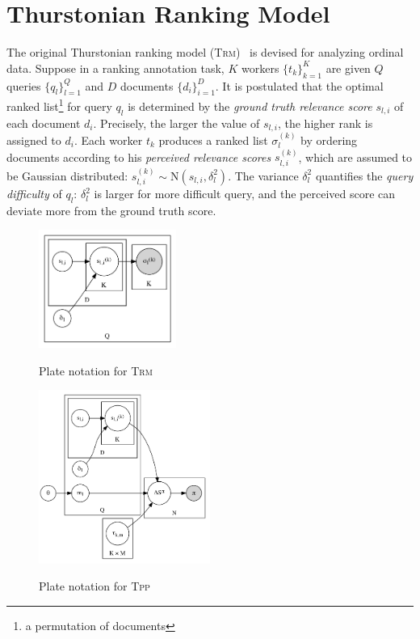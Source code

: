 \section{Thurstonian Ranking Model} \label{sec::tpp_trm}

The original Thurstonian ranking model (\textsc{Trm})~\cite{thurstone1927law} is
devised for analyzing ordinal data.  Suppose in a ranking annotation task, $K$
workers $\{t_k\}_{k=1}^{K}$ are given $Q$ queries $\{q_l\}_{l=1}^Q$ and $D$
documents $\{d_i\}_{i=1}^D$.  It is postulated that the optimal ranked
list\footnote{a permutation of documents} for query $q_l$ is determined by the
\emph{ground truth relevance score} $s_{l,i}$ of each document $d_i$.
Precisely, the larger the value of $s_{l,i}$, the higher rank is assigned to
$d_i$.  Each worker $t_k$ produces a ranked list $\sigma_l^{(k)}$ by ordering
documents according to his \emph{perceived relevance scores} $s_{l,i}^{(k)}$,
which are assumed to be Gaussian distributed: $s_{l,i}^{(k)} \sim
\mathrm{N}(s_{l,i}, \delta_l^2)$.  The variance $\delta_l^2$ quantifies the
\emph{query difficulty} of $q_l$: $\delta_l^2$ is larger for more difficult
query, and the perceived score can deviate more from the ground truth score.

\begin{figure}[h!]
	\begin{center}
		\includegraphics[width=0.4\textwidth]{crowd-thurstonian/figure/thurstonian.png}
		\caption{Plate notation for \textsc{Trm}} \label{fig::thurstonian}
		\includegraphics[width=0.5\textwidth]{crowd-thurstonian/figure/tpp.png}
		\caption{Plate notation for \textsc{Tpp}} \label{fig::tpp}
	\end{center}
\end{figure}

